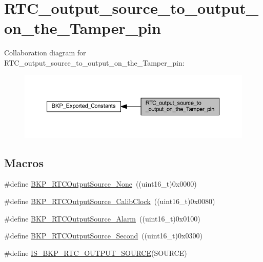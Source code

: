 \hypertarget{group___r_t_c__output__source__to__output__on__the___tamper__pin}{}\section{R\+T\+C\+\_\+output\+\_\+source\+\_\+to\+\_\+output\+\_\+on\+\_\+the\+\_\+\+Tamper\+\_\+pin}
\label{group___r_t_c__output__source__to__output__on__the___tamper__pin}
Collaboration diagram for R\+T\+C\+\_\+output\+\_\+source\+\_\+to\+\_\+output\+\_\+on\+\_\+the\+\_\+\+Tamper\+\_\+pin\+:
\nopagebreak
\begin{figure}[H]
\begin{center}
\leavevmode
\includegraphics[width=350pt]{group___r_t_c__output__source__to__output__on__the___tamper__pin}
\end{center}
\end{figure}
\subsection*{Macros}
\begin{DoxyCompactItemize}
\item 
\#define \hyperlink{group___r_t_c__output__source__to__output__on__the___tamper__pin_ga8a18950396b2db70311480ab76464c6e}{B\+K\+P\+\_\+\+R\+T\+C\+Output\+Source\+\_\+\+None}~((uint16\+\_\+t)0x0000)
\item 
\#define \hyperlink{group___r_t_c__output__source__to__output__on__the___tamper__pin_ga6fd7cb80bb52bca65641cbe6aa2c4590}{B\+K\+P\+\_\+\+R\+T\+C\+Output\+Source\+\_\+\+Calib\+Clock}~((uint16\+\_\+t)0x0080)
\item 
\#define \hyperlink{group___r_t_c__output__source__to__output__on__the___tamper__pin_gac016224386421d0cb1c0cd0ee201d65a}{B\+K\+P\+\_\+\+R\+T\+C\+Output\+Source\+\_\+\+Alarm}~((uint16\+\_\+t)0x0100)
\item 
\#define \hyperlink{group___r_t_c__output__source__to__output__on__the___tamper__pin_ga23cb72635820331317ee4ee5a7897a70}{B\+K\+P\+\_\+\+R\+T\+C\+Output\+Source\+\_\+\+Second}~((uint16\+\_\+t)0x0300)
\item 
\#define \hyperlink{group___r_t_c__output__source__to__output__on__the___tamper__pin_gac59454ee255feb55b5e14c34b70c99da}{I\+S\+\_\+\+B\+K\+P\+\_\+\+R\+T\+C\+\_\+\+O\+U\+T\+P\+U\+T\+\_\+\+S\+O\+U\+R\+CE}(S\+O\+U\+R\+CE)
\end{DoxyCompactItemize}


